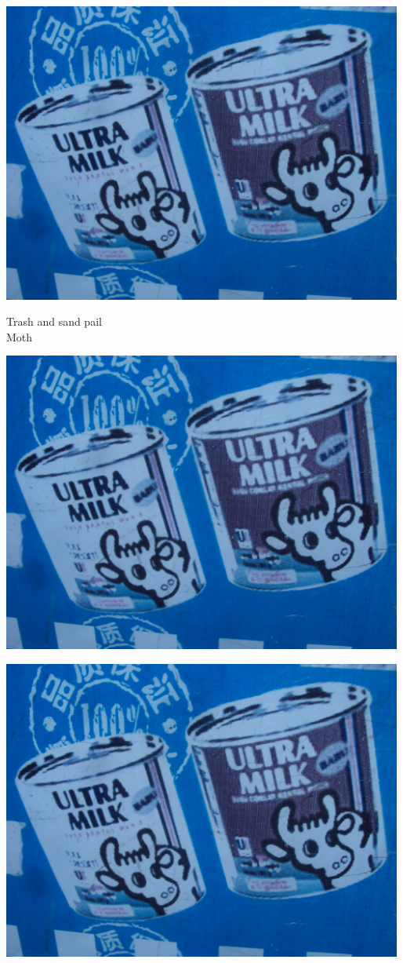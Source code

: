 \documentclass[10pt,letterpaper]{article}
\begin{document}
\vspace{0.25in}
\includegraphics[width=5.19in]{landscape.jpg}

Trash and sand pail\\
Moth\\
\pagebreak

\includegraphics[width=5.19in]{landscape.jpg}

\vspace{0.25in}
\includegraphics[width=5.19in]{landscape.jpg}
\end{document}
